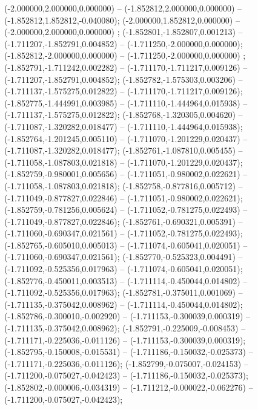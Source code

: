  (-2.000000,2.000000,0.000000) -- (-1.852812,2.000000,0.000000) -- (-1.852812,1.852812,-0.040080);
 (-2.000000,1.852812,0.000000) -- (-2.000000,2.000000,0.000000) ;
 (-1.852801,-1.852807,0.001213) -- (-1.711207,-1.852791,0.004852) -- (-1.711250,-2.000000,0.000000);
 (-1.852812,-2.000000,0.000000) -- (-1.711250,-2.000000,0.000000) ;
 (-1.852791,-1.711242,0.002282) -- (-1.711170,-1.711217,0.009126) -- (-1.711207,-1.852791,0.004852);
 (-1.852782,-1.575303,0.003206) -- (-1.711137,-1.575275,0.012822) -- (-1.711170,-1.711217,0.009126);
 (-1.852775,-1.444991,0.003985) -- (-1.711110,-1.444964,0.015938) -- (-1.711137,-1.575275,0.012822);
 (-1.852768,-1.320305,0.004620) -- (-1.711087,-1.320282,0.018477) -- (-1.711110,-1.444964,0.015938);
 (-1.852764,-1.201245,0.005110) -- (-1.711070,-1.201229,0.020437) -- (-1.711087,-1.320282,0.018477);
 (-1.852761,-1.087810,0.005455) -- (-1.711058,-1.087803,0.021818) -- (-1.711070,-1.201229,0.020437);
 (-1.852759,-0.980001,0.005656) -- (-1.711051,-0.980002,0.022621) -- (-1.711058,-1.087803,0.021818);
 (-1.852758,-0.877816,0.005712) -- (-1.711049,-0.877827,0.022846) -- (-1.711051,-0.980002,0.022621);
 (-1.852759,-0.781256,0.005624) -- (-1.711052,-0.781275,0.022493) -- (-1.711049,-0.877827,0.022846);
 (-1.852761,-0.690321,0.005391) -- (-1.711060,-0.690347,0.021561) -- (-1.711052,-0.781275,0.022493);
 (-1.852765,-0.605010,0.005013) -- (-1.711074,-0.605041,0.020051) -- (-1.711060,-0.690347,0.021561);
 (-1.852770,-0.525323,0.004491) -- (-1.711092,-0.525356,0.017963) -- (-1.711074,-0.605041,0.020051);
 (-1.852776,-0.450011,0.003513) -- (-1.711114,-0.450044,0.014802) -- (-1.711092,-0.525356,0.017963);
 (-1.852781,-0.375011,0.001069) -- (-1.711135,-0.375042,0.008962) -- (-1.711114,-0.450044,0.014802);
 (-1.852786,-0.300010,-0.002920) -- (-1.711153,-0.300039,0.000319) -- (-1.711135,-0.375042,0.008962);
 (-1.852791,-0.225009,-0.008453) -- (-1.711171,-0.225036,-0.011126) -- (-1.711153,-0.300039,0.000319);
 (-1.852795,-0.150008,-0.015531) -- (-1.711186,-0.150032,-0.025373) -- (-1.711171,-0.225036,-0.011126);
 (-1.852799,-0.075007,-0.024153) -- (-1.711200,-0.075027,-0.042423) -- (-1.711186,-0.150032,-0.025373);
 (-1.852802,-0.000006,-0.034319) -- (-1.711212,-0.000022,-0.062276) -- (-1.711200,-0.075027,-0.042423);
